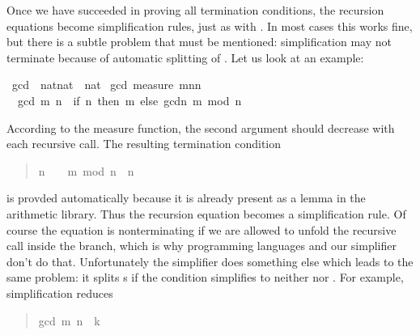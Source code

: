 \begin{isabelle}%
%
\begin{isamarkuptext}%
Once we have succeeded in proving all termination conditions, the recursion
equations become simplification rules, just as with
. In most cases this works fine, but there is a subtle
problem that must be mentioned: simplification may not
terminate because of automatic splitting of .
Let us look at an example:%
\end{isamarkuptext}%
\ gcd\ {\isacharcolon}{\isacharcolon}\ {\isachardoublequote}nat{\isacharasterisk}nat\ {\isasymRightarrow}\ nat{\isachardoublequote}\isanewline
{}\ gcd\ {\isachardoublequote}measure\ {\isacharparenleft}{\isasymlambda}{\isacharparenleft}m{\isacharcomma}n{\isacharparenright}{\isachardot}n{\isacharparenright}{\isachardoublequote}\isanewline
\ \ {\isachardoublequote}gcd\ {\isacharparenleft}m{\isacharcomma}\ n{\isacharparenright}\ {\isacharequal}\ {\isacharparenleft}if\ n{\isacharequal}\ then\ m\ else\ gcd{\isacharparenleft}n{\isacharcomma}\ m\ mod\ n{\isacharparenright}{\isacharparenright}{\isachardoublequote}%
\begin{isamarkuptext}%
\noindent
According to the measure function, the second argument should decrease with
each recursive call. The resulting termination condition
\begin{quote}

\begin{isabelle}%
\mbox{n}\ {\isasymnoteq}\ \ {\isasymLongrightarrow}\ \mbox{m}\ mod\ \mbox{n}\ {\isacharless}\ \mbox{n}
\end{isabelle}%

\end{quote}
is provded automatically because it is already present as a lemma in the
arithmetic library. Thus the recursion equation becomes a simplification
rule. Of course the equation is nonterminating if we are allowed to unfold
the recursive call inside the  branch, which is why programming
languages and our simplifier don't do that. Unfortunately the simplifier does
something else which leads to the same problem: it splits s if the
condition simplifies to neither  nor . For
example, simplification reduces
\begin{quote}

\begin{isabelle}%
gcd\ {\isacharparenleft}\mbox{m}{\isacharcomma}\ \mbox{n}{\isacharparenright}\ {\isacharequal}\ \mbox{k}
\end{isabelle}%


\end{quote}
\end{isamarkuptext}
\end{isabelle}
